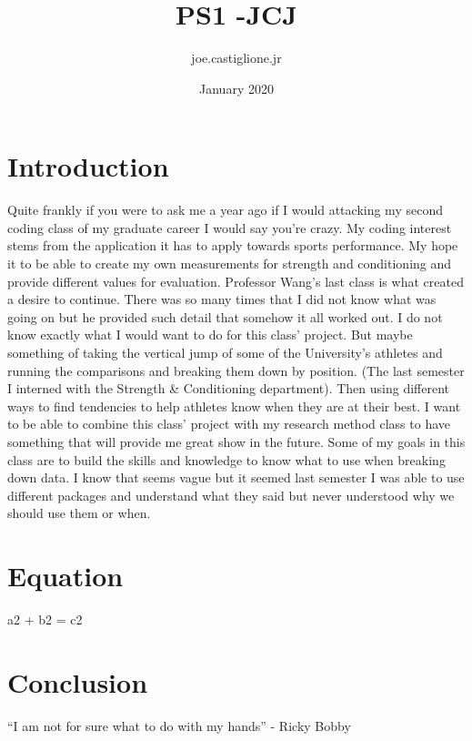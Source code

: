\documentclass{article}
\title{PS1 -JCJ}
\author{joe.castiglione.jr }
\date{January 2020}
\begin{document}
\maketitle

\section{Introduction}
Quite frankly if you were to ask me a year ago if I would attacking my second coding class of my graduate career I would say you're crazy. My coding interest stems from the application it has to apply towards sports performance. My hope it to be able to create my own measurements for strength and conditioning and provide different values for evaluation. Professor Wang's last class is what created a desire to continue. There was so many times that I did not know what was going on but he provided such detail that somehow it all worked out. 
I do not know exactly what I would want to do for this class' project. But maybe something of taking the vertical jump of some of the University's athletes and running the comparisons and breaking them down by position. (The last semester I interned with the Strength & Conditioning department). Then using different ways to find tendencies to help athletes know when they are at their best. I want to be able to combine this class' project with my research method class to have something that will provide me great show in the future.  Some of my goals in this class are to build the skills and knowledge to know what to use when breaking down data. I know that seems vague but it seemed last semester I was able to use different packages and understand what they said but never understood why we should use them or when. 
\section{Equation}
a2 + b2 = c2


\section{Conclusion}
``I am not for sure what to do with my hands'' - Ricky Bobby 
\citep{}



\end{document}
